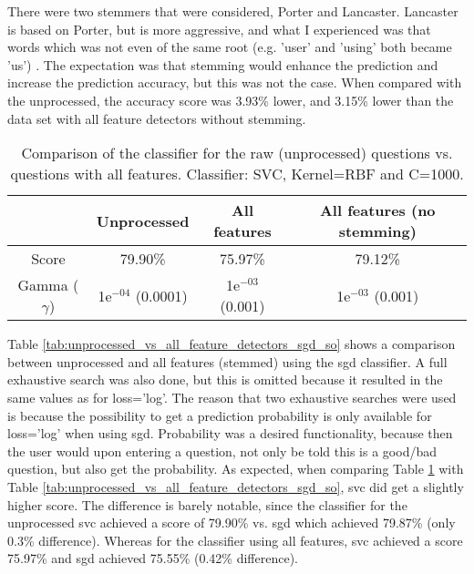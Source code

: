 There were two stemmers that were considered, Porter and Lancaster.
Lancaster is based on Porter, but is more aggressive, and what I experienced was that words which was not even of the same root (e.g. 'user' and 'using' both became 'us') \cite{Textprocessing.com2016}.
The expectation was that stemming would enhance the prediction and increase the prediction accuracy, but this was not the case. 
When compared with the unprocessed, the accuracy score was 3.93\% lower, and 3.15\% lower than the data set with all feature detectors without stemming.
\begin{table}[!h]%
	\centering
	\begin{tabular}{| c | c | c | c |}
		\hline
		~ 					& Unprocessed			& All features			& All features (no stemming)	\\ \hline
		Score 				& 79.90\%				& 75.97\%				& 79.12\%						\\ \hline
		Gamma ($\gamma$)	& 1e$^{-04}$ (0.0001)	& 1e$^{-03}$ (0.001)	& 1e$^{-03}$ (0.001) 			\\ \hline
	\end{tabular}
	\caption{Comparison of the classifier for the raw (unprocessed) questions vs. questions with all features. Classifier: SVC, Kernel=RBF and C=1000.}
	\label{tab:unprocessed_vs_all_feature_detectors_svc_so}
\end{table}
\vspace{0.5em}\newline
Table \ref{tab:unprocessed_vs_all_feature_detectors_sgd_so} shows a comparison between unprocessed and all features (stemmed) using the \gls{sgd} classifier.
A full exhaustive search was also done, but this is omitted because it resulted in the same values as for loss='log'.
The reason that two exhaustive searches were used is because the possibility to get a prediction probability is only available for loss='log' when using \gls{sgd}.
Probability was a desired functionality, because then the user would upon entering a question, not only be told this is a good/bad question, but also get the probability.
As expected, when comparing Table \ref{tab:unprocessed_vs_all_feature_detectors_svc_so} with Table \ref{tab:unprocessed_vs_all_feature_detectors_sgd_so}, \gls{svc} did get a slightly higher score.
The difference is barely notable, since the classifier for the unprocessed \gls{svc} achieved a score of 79.90\% vs. \gls{sgd} which achieved 79.87\% (only 0.3\% difference).
Whereas for the classifier using all features, \gls{svc} achieved a score 75.97\% and \gls{sgd} achieved 75.55\% (0.42\% difference). 

